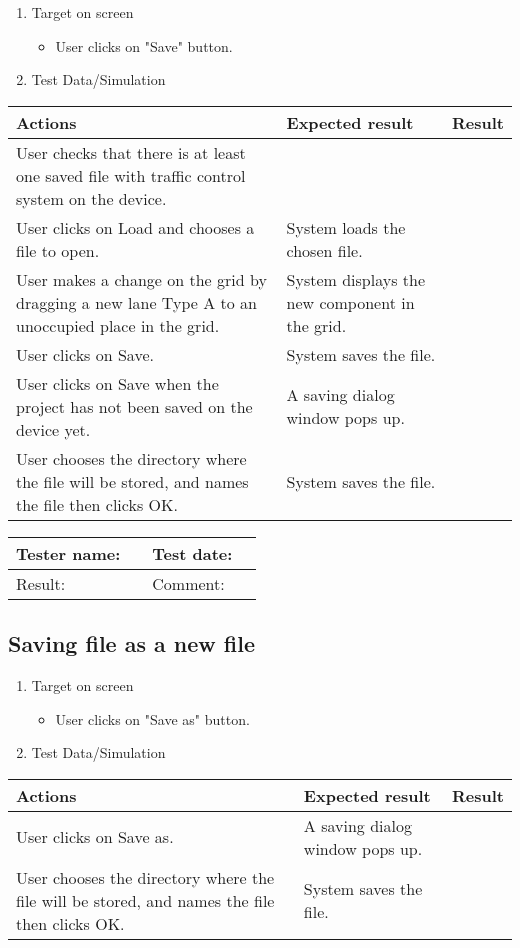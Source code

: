 \begin{enumerate}
	
	\item Target on screen
	\begin{itemize}
		\item User clicks on "Save" button.
	\end{itemize}
	\item Test Data/Simulation
\end{enumerate}
	\begin{tabularx}{\textwidth}{|X|X|p{2.5cm}|}\hline
		Actions & Expected result & Result \\\hline

		User checks that there is at least one saved file with traffic control system on the device.& &\pass \\\hline
		User clicks on Load and chooses a file to open. & System loads the chosen file.  & \pass \\\hline 
		User makes a change on the grid by dragging a new lane Type A to an unoccupied place in the grid. & System displays the new component in the grid. & \pass \\\hline 
		User clicks on Save. & System saves the file.  & \pass \\\hline 
		User clicks on Save when the project has not been saved on the device yet. & A saving dialog window pops up. & \pass \\\hline
		User chooses the directory where the file will be stored, and names the file then clicks OK. & System saves the file. & \pass \\\hline 
	\end{tabularx}

\begin{tabularx}{\textwidth}{|p{3cm}X|p{3cm}X|}\hline
	Tester name: &  & Test date: & \\\hline
	Result: &  \pass & Comment: & \\\hline
\end{tabularx}

\newpage
\subsection{Saving file as a new file}

\begin{enumerate}
	\item Target on screen
	\begin{itemize}
		\item User clicks on "Save as" button.
	\end{itemize}
	\item Test Data/Simulation
\end{enumerate}
	\begin{tabularx}{\textwidth}{|X|X|p{2.5cm}|}\hline
		Actions & Expected result & Result \\\hline

		User clicks on Save as. & A saving dialog window pops up. & \pass \\\hline
		User chooses the directory where the file will be stored, and names the file then clicks OK. & System saves the file. & \pass \\\hline 
	\end{tabularx}

